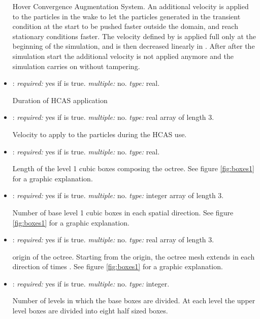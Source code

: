 \begin{itemize}
Hover Convergence Augmentation System. An additional velocity is applied 
to the particles in the wake to let the particles generated in the transient 
condition at the start to be pushed faster outside the domain, and reach 
stationary conditions faster. The velocity defined by  
is applied full only at the beginning of the simulation, and is then decreased 
linearly in . After  after the simulation 
start the additional velocity is not applied anymore and the simulation carries 
on without tampering. 

\item {}: \textit{required:} yes if  is true. 
\textit{multiple:} no. \textit{type:} real.

Duration of HCAS application

\item {}: \textit{required:} yes if  is true. 
\textit{multiple:} no. \textit{type:} real array of length 3.

Velocity to apply to the particles during the HCAS use. 

\item {}: \textit{required:} yes if  is true. 
\textit{multiple:} no. \textit{type:} real.

Length of the level 1 cubic boxes composing the octree. See figure 
\ref{fig:boxes1} for a graphic explanation.

\item {}: \textit{required:} yes if  is true. 
\textit{multiple:} no. \textit{type:} integer array of length 3.

Number of base level 1 cubic boxes in each spatial direction. See figure 
\ref{fig:boxes1} for a graphic explanation.

\item {}: \textit{required:} yes if  is true. 
\textit{multiple:} no. \textit{type:} real array of length 3. 

origin of the octree. Starting from the origin, the octree mesh extends in 
each direction of  times . 
See figure \ref{fig:boxes1} for a graphic explanation.

\item {}: \textit{required:} yes if  is true. 
\textit{multiple:} no. \textit{type:} integer.

Number of levels in  which the base boxes are divided. At each level 
the upper level boxes are divided into eight half sized boxes. 


\end{itemize}
